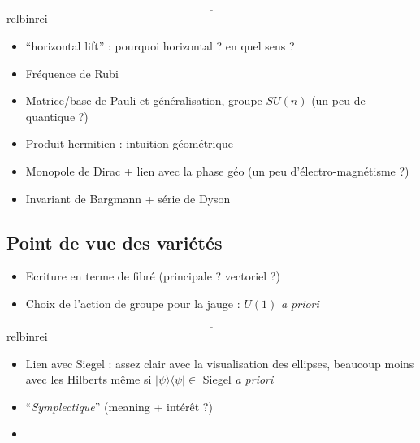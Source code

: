 \documentclass[hidelinks, french, oneside]{article}
\theoremstyle{enonce}
\theoremstyle{special}
\theoremstyle{rqlike}
\theoremstyle{exo}
\theoremstyle{demo}
\begin{document}
\[\underline{\overline{\qquad\qquad\qquad\qquad\qquad\qquad\qquad\qquad\qquad\qquad\qquad\qquad\qquad\qquad\qquad\qquad\qquad\qquad}}\]{\color{white}relbinrei}

\begin{itemize}
	\item ``horizontal lift'' : pourquoi horizontal ? en quel sens ?
	\item Fréquence de Rubi
	\item Matrice/base de Pauli et généralisation, groupe $SU(n)$ (un peu de quantique ?)
	\item Produit hermitien : intuition géométrique
	\item Monopole de Dirac + lien avec la phase géo (un peu d'électro-magnétisme ?)
	\item Invariant de Bargmann + série de Dyson
\end{itemize}



\subsection{Point de vue des variétés}\label{subsec:phaseG_variete}

\begin{itemize}
	\item Ecriture en terme de fibré (principale ? vectoriel ?)
	
	\item Choix de l'action de groupe pour la jauge : $U(1)$ \textit{a priori}
\end{itemize}

\[\underline{\overline{\qquad\qquad\qquad\qquad\qquad\qquad\qquad\qquad\qquad\qquad\qquad\qquad\qquad\qquad\qquad\qquad\qquad\qquad}}\]{\color{white}relbinrei}

\begin{itemize}
	\item Lien avec Siegel : assez clair avec la visualisation des ellipses, beaucoup moins avec les Hilberts même si $| \psi\rangle \langle \psi |\in$ Siegel \textit{a priori}
	
	\item ``\textit{Symplectique}'' (meaning + intérêt ?)
	
	\item 
\end{itemize}



\newpage
\listoffigures
\vfill
\lstlistoflistings
\vfill

\newpage

{}

\end{document}

